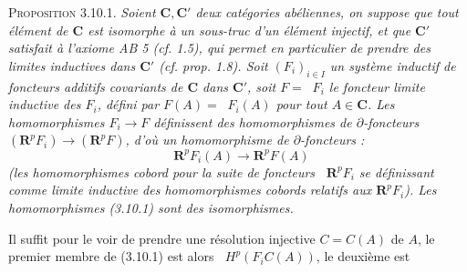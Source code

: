 \textsc{Proposition 3.10.1.} \textit{Soient $\mathbf C,\mathbf C'$ deux
catégories abéliennes, on suppose que tout élément de $\mathbf C$ est
isomorphe à un sous-truc d'un élément injectif, et que $\mathbf C'$ satisfait
à l'axiome \textup{AB 5 (}cf. \textup{1.5)}, qui permet en particulier de prendre des limites
inductives dans $\mathbf C'$ \textup{(}cf. prop. \textup{1.8)}. Soit $(F_i)_{i\in I}$ un
système inductif de foncteurs additifs covariants de $\mathbf C$ dans
$\mathbf C'$, soit $F=\mathop{\underset{\to}{\lim}} F_i$ le foncteur limite inductive des $F_i$,
défini par $F(A)=\mathop{\underset{\to}{\lim}} F_i(A)$ pour tout $A\in\mathbf C$. Les
homomorphismes $F_i\to F$ définissent des homomorphismes de
$\partial$-foncteurs $(\mathbf R^pF_i)\to(\mathbf R^pF)$, d'où
un homomorphisme de $\partial$-foncteurs :}
\[
\tag{3.10.1.}
\mathop{\underset{\to}{\lim}} \mathbf R^pF_i(A)\to \mathbf R^pF(A)
\]
\textit{\textup{(}les homomorphismes cobord pour la suite de foncteurs
$\mathop{\underset{\to}{\lim}}\mathbf R^pF_i$ se définissant comme limite inductive des
homomorphismes cobords relatifs aux $\mathbf R^pF_i$\textup{)}. Les homomorphismes
\textup{(3.10.1)} sont des isomorphismes.}

Il suffit pour le voir de prendre une résolution injective
$C=C(A)$ de $A$, le premier membre de (3.10.1) est alors
$\mathop{\underset{\to}{\lim}} H^p(F_iC(A))$, le deuxième est

